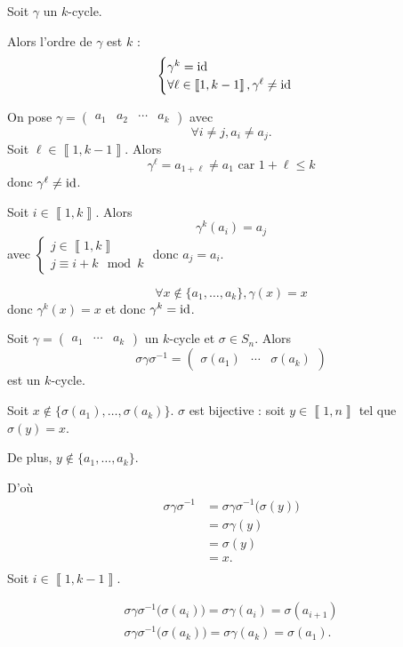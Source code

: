 \begin{prop}
	Soit $\gamma$ un $k$-cycle.

	Alors l'ordre de $\gamma$ est $k$ : \[
		\begin{cases}
			\gamma^{k}= \operatorname{id}\\
			\forall \ell \in \left\llbracket 1,k-1 \right\rrbracket, \gamma^{\ell} \neq \operatorname{id}
		\end{cases}
	\]
\end{prop}

\begin{prv}
	On pose $\gamma = \begin{pmatrix}
		a_1&a_2&\cdots&a_k
	\end{pmatrix}$ avec \[
		\forall i \neq j, a_i \neq a_j.
	\] Soit $\ell \in \left\llbracket 1,k-1 \right\rrbracket$. Alors \[
		\gamma^{\ell} = a_{1+\ell} \neq a_1 \text{ car } 1 + \ell \le k
	\] donc $\gamma^{\ell} \neq \operatorname{id}$.

	Soit $i \in \left\llbracket 1,k \right\rrbracket$. Alors \[
		\gamma^{k}(a_i) = a_j
	\] avec $\begin{cases}
		j \in \left\llbracket 1,k \right\rrbracket\\
		j \equiv i + k \mod k
	\end{cases}$ donc $a_j = a_i$.

	\[
		\forall x \not\in \{a_1, \ldots, a_k\}, \gamma(x) = x
	\] donc $\gamma^{k}(x) = x$ et donc $\gamma^{k} = \operatorname{id}$.
\end{prv}

\begin{prop}
	Soit $\gamma = \begin{pmatrix}
		a_1&\cdots&a_k
	\end{pmatrix}$ un $k$-cycle et $\sigma \in S_n$. Alors \[
		\sigma\gamma\sigma^{-1} = \begin{pmatrix}
			\sigma(a_1)&\cdots&\sigma(a_k)
		\end{pmatrix}
	\] est un $k$-cycle.
\end{prop}

\begin{prv}
	Soit $x \not\in \{\sigma(a_1), \ldots, \sigma(a_k)\}$. $\sigma$ est bijective : soit $y \in \left\llbracket 1,n \right\rrbracket$ tel que $\sigma(y) = x$.

	De plus, $y \not\in \{a_1, \ldots, a_k\}$.

	D'où
	\begin{align*}
		\sigma\gamma\sigma^{-1} &= \sigma\gamma\sigma^{-1}\big(\sigma(y)\big)  \\
		&= \sigma\gamma(y) \\
		&= \sigma(y) \\
		&= x. \\
	\end{align*}
	Soit $i \in \left\llbracket 1,k-1 \right\rrbracket$.

	\begin{align*}
		\sigma\gamma\sigma^{-1}\big(\sigma(a_i)\big) = \sigma\gamma(a_i) = \sigma(a_{i+1})\\
		\sigma\gamma\sigma^{-1}\big(\sigma(a_k)\big)  = \sigma\gamma(a_k) = \sigma(a_1).
	\end{align*}
\end{prv}

